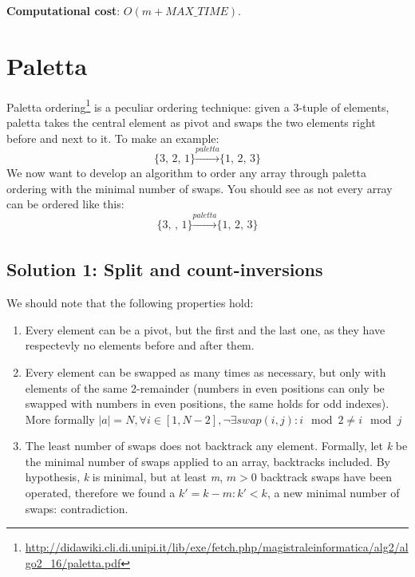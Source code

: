 \documentclass{article}
\begin{document}
\begin{framed}
  \noindent
  \textbf{Computational cost}: $O(m + MAX\_TIME)$.
\end{framed}


\section{Paletta}

Paletta ordering\footnote{\url{http://didawiki.cli.di.unipi.it/lib/exe/fetch.php/magistraleinformatica/alg2/algo2_16/paletta.pdf}}
is a peculiar ordering technique: given a 3-tuple of elements, paletta takes the
central element as pivot and swaps the two elements right before and next to it.
To make an example:
\begin{equation}
  \textrm{\{3, 2, 1\}} \xrightarrow{paletta} \textrm{\{1, 2, 3\}}
\end{equation}
We now want to develop an algorithm to order any array through paletta ordering
with the minimal number of swaps.
You should see as not every array can be ordered like this:
  \begin{equation}
  \textrm{\{3, , 1\}} \xrightarrow[]{paletta} \textrm{\{1, 2, 3\}}
  \end{equation}

\subsection{Solution 1: Split and count-inversions}

We should note that the following properties hold:
\begin{enumerate}
    \item Every element can be a pivot, but the first and the last one, as they
    have respectevly no elements before and after them.
    \item Every element can be swapped as many times as necessary, but only with
    elements of the same 2-remainder (numbers in even positions can only be
    swapped with numbers in even positions, the same holds for odd indexes).
    More formally $|a| = N, \forall i \in [1, N - 2], \neg \exists swap(i, j):
                    i \mod 2 \neq i \mod j$
    \item The least number of swaps does not backtrack any element.
    Formally, let \emph{k} be the minimal number of swaps applied to an array,
    backtracks included. By hypothesis, \emph{k} is minimal, but at least \emph{m},
    $m > 0$ backtrack swaps have been operated, therefore we found a
    $k' = k - m: k' < k$, a new minimal number of swaps: contradiction.
\end{enumerate}
\end{document}
